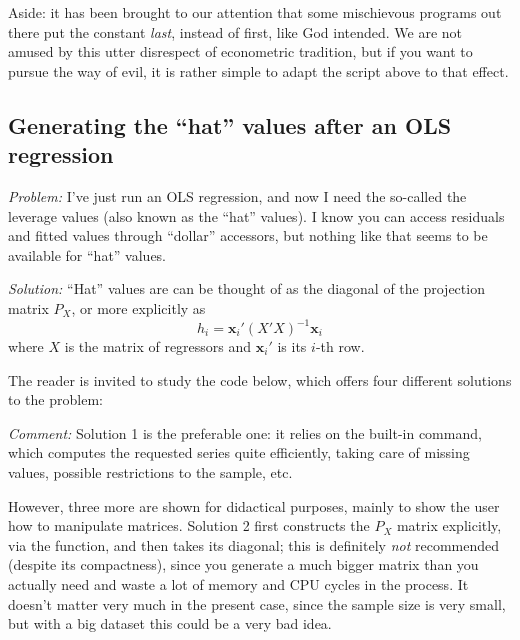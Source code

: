Aside: it has been brought to our attention that some mischievous
programs out there put the constant \emph{last}, instead of first,
like God intended. We are not amused by this utter disrespect of
econometric tradition, but if you want to pursue the way of evil, it
is rather simple to adapt the script above to that effect.


\subsection{Generating the ``hat'' values after an OLS regression}
\label{sec:hatvalues}

\emph{Problem:} I've just run an OLS regression, and now I need the
so-called the leverage values (also known as the ``hat'' values). I
know you can access residuals and fitted values through ``dollar''
accessors, but nothing like that seems to be available for ``hat''
values.

\emph{Solution:}
``Hat'' values are can be thought of as the diagonal of the projection
matrix $P_X$, or more explicitly as
\[
h_i = \mathbf{x}_i' (X'X)^{-1} \mathbf{x}_i
\]
where $X$ is the matrix of regressors and $\mathbf{x}_i'$ is its
$i$-th row.

The reader is invited to study the code below, which offers four
different solutions to the problem:


\emph{Comment:} Solution 1 is the preferable one: it relies on the
built-in  command, which computes the requested series
quite efficiently, taking care of missing values, possible
restrictions to the sample, etc.

However, three more are shown for didactical purposes, mainly to show
the user how to manipulate matrices. Solution 2 first constructs the
$P_X$ matrix explicitly, via the  function, and then takes
its diagonal; this is definitely \emph{not} recommended (despite its
compactness), since you generate a much bigger matrix than you
actually need and waste a lot of memory and CPU cycles in the
process. It doesn't matter very much in the present case, since the
sample size is very small, but with a big dataset this could be a very
bad idea.

